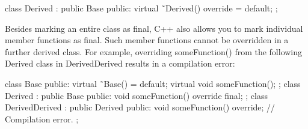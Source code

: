 \begin{cpp}
class Derived : public Base
{
    public:
        virtual ˜Derived() override = default;
};
\end{cpp}


Besides marking an entire class as final, C++ also allows you to mark individual member functions as final. Such member functions cannot be overridden in a further derived class. For example, overriding someFunction() from the following Derived class in DerivedDerived results in a compilation error:

\begin{cpp}
class Base
{
    public:
        virtual ˜Base() = default;
        virtual void someFunction();
};
class Derived : public Base
{
    public:
        void someFunction() override final;
};
class DerivedDerived : public Derived
{
    public:
        void someFunction() override; // Compilation error.
};
\end{cpp}






